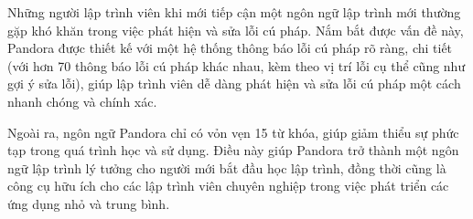 Những người lập trình viên khi mới tiếp cận một ngôn ngữ lập trình mới thường gặp khó khăn trong việc phát hiện và sửa lỗi cú pháp. Nắm bắt được vấn đề này, Pandora được thiết kế với một hệ thống thông báo lỗi cú pháp rõ ràng, chi tiết (với hơn 70 thông báo lỗi cú pháp khác nhau, kèm theo vị trí lỗi cụ thể cũng như gợi ý sửa lỗi), giúp lập trình viên dễ dàng phát hiện và sửa lỗi cú pháp một cách nhanh chóng và chính xác.

Ngoài ra, ngôn ngữ Pandora chỉ có vỏn vẹn 15 từ khóa, giúp giảm thiểu sự phức tạp trong quá trình học và sử dụng. Điều này giúp Pandora trở thành một ngôn ngữ lập trình lý tưởng cho người mới bắt đầu học lập trình, đồng thời cũng là công cụ hữu ích cho các lập trình viên chuyên nghiệp trong việc phát triển các ứng dụng nhỏ và trung bình. 
